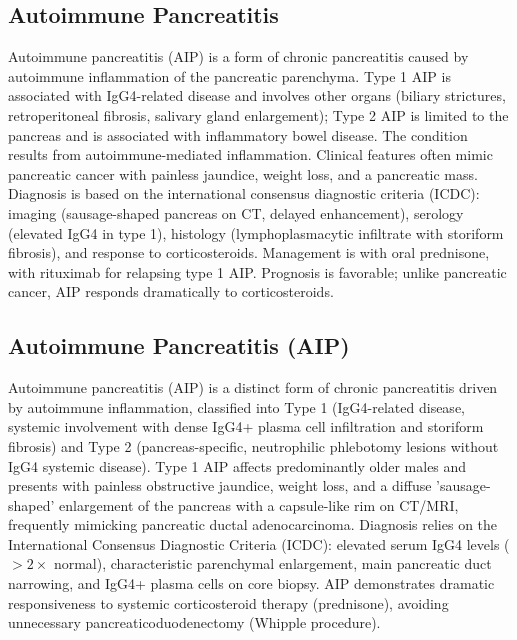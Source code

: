\subsection{Autoimmune Pancreatitis}
\label{sec:Autoimmune Pancreatitis}
Autoimmune pancreatitis (AIP) is a form of chronic pancreatitis caused by autoimmune inflammation of the pancreatic parenchyma. Type 1 AIP is associated with IgG4-related disease and involves other organs (biliary strictures, retroperitoneal fibrosis, salivary gland enlargement); Type 2 AIP is limited to the pancreas and is associated with inflammatory bowel disease. The condition results from autoimmune-mediated inflammation. Clinical features often mimic pancreatic cancer with painless jaundice, weight loss, and a pancreatic mass. Diagnosis is based on the international consensus diagnostic criteria (ICDC): imaging (sausage-shaped pancreas on CT, delayed enhancement), serology (elevated IgG4 in type 1), histology (lymphoplasmacytic infiltrate with storiform fibrosis), and response to corticosteroids. Management is with oral prednisone, with rituximab for relapsing type 1 AIP. Prognosis is favorable; unlike pancreatic cancer, AIP responds dramatically to corticosteroids.

\subsection{Autoimmune Pancreatitis (AIP)}
\label{sec:Autoimmune Pancreatitis (AIP)}
Autoimmune pancreatitis (AIP) is a distinct form of chronic pancreatitis driven by autoimmune inflammation, classified into Type 1 (IgG4-related disease, systemic involvement with dense IgG4+ plasma cell infiltration and storiform fibrosis) and Type 2 (pancreas-specific, neutrophilic phlebotomy lesions without IgG4 systemic disease). Type 1 AIP affects predominantly older males and presents with painless obstructive jaundice, weight loss, and a diffuse 'sausage-shaped' enlargement of the pancreas with a capsule-like rim on CT/MRI, frequently mimicking pancreatic ductal adenocarcinoma. Diagnosis relies on the International Consensus Diagnostic Criteria (ICDC): elevated serum IgG4 levels ($>2\times$ normal), characteristic parenchymal enlargement, main pancreatic duct narrowing, and IgG4+ plasma cells on core biopsy. AIP demonstrates dramatic responsiveness to systemic corticosteroid therapy (prednisone), avoiding unnecessary pancreaticoduodenectomy (Whipple procedure).

